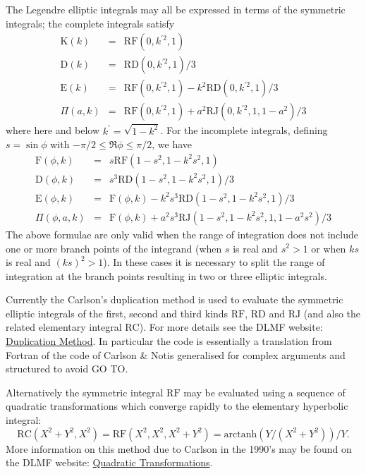 The Legendre elliptic integrals may all be expressed in terms of the symmetric
integrals; the complete integrals satisfy
\begin{eqnarray*}
\mathrm{K}(k) &=& \mathrm{RF}(0,k^{\prime 2},1) \\
\mathrm{D}(k) &=& \mathrm{RD}(0,k^{\prime 2},1)/3 \\
\mathrm{E}(k) &=& \mathrm{RF}(0,k^{\prime 2},1)-k^2\mathrm{RD}(0,k^{\prime 2},1)/3\\
\Pi(a,k) &=&\mathrm{RF}(0,k^{\prime 2},1)+a^2\mathrm{RJ}(0,k^{\prime 2},1,1-a^2)/3
\end{eqnarray*}
where here and below $k^\prime=\sqrt{1-k^2}$. For the incomplete integrals,
defining $s=\sin \phi$ with $-\pi/2 \leq \Re{\phi} \leq \pi/2$, we have
\begin{eqnarray*}
\mathrm{F}(\phi,k) &=& s \mathrm{RF}(1-s^2, 1-k^2s^2, 1)\\
\mathrm{D}(\phi,k) &=& s^3 \mathrm{RD}(1-s^2, 1-k^2s^2, 1)/3\\
\mathrm{E}(\phi,k) &=&\mathrm{F}(\phi,k)-k^2s^3\mathrm{RD}(1-s^2,1-k^2s^2,1)/3\\
\Pi(\phi,a,k) &=&\mathrm{F}(\phi,k) +a^2s^3\mathrm{RJ}(1-s^2,1-k^2s^2,1,1-a^2s^2)/3
\end{eqnarray*}
The above formulae are only valid when the range of integration does not
include one or more branch points of the integrand (when $s$ is real and
$s^2>1$ or when $k s$ is real and $(k s)^2 >1$).  In these cases it is necessary
to split the range of integration at the branch points resulting in two or three
elliptic integrals.

Currently the Carlson's duplication method is used to evaluate the
symmetric elliptic integrals of the first, second and third kinds
$\mathrm{RF}$, $\mathrm{RD}$ and $\mathrm{RJ}$ (and also the related
elementary integral $\mathrm{RC}$).  For more details see the DLMF website:
\href{https://dlmf.nist.gov/19.36#i}{Duplication Method}.
In particular the \REDUCE code  is essentially a translation from
Fortran of the code of Carlson \& Notis \cite{CarlsonNotis:81} generalised
for complex arguments and structured to avoid GO TO.

Alternatively the symmetric integral $\mathrm{RF}$ may be evaluated
using a sequence of quadratic transformations 
which converge rapidly to the elementary hyperbolic integral:
\[\mathrm{RC}(X^2+Y^2,X^2) = \mathrm{RF}(X^2,X^2,X^2+Y^2) = \mathrm{arctanh}
(Y/(X^2+Y^2))/Y.\]
More information on this method due to Carlson in the 1990's
may be found on the DLMF website:
\href{https://dlmf.nist.gov/19.36#ii}{Quadratic Transformations}.

